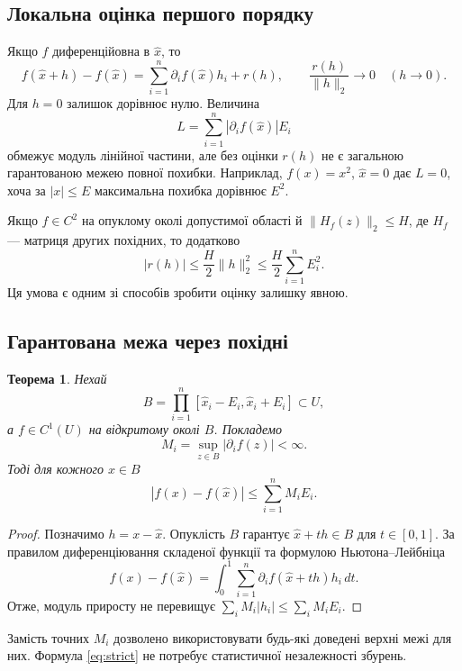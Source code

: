 \documentclass[11pt,a4paper]{article}
\newtheorem{theorem}[definition]{Теорема}
\theoremstyle{remark}
\newcommand{\xh}{\widehat x}
\begin{document}
\subsection*{Локальна оцінка першого порядку}
Якщо $f$ диференційовна в $\xh$, то
\begin{equation}\label{eq:taylor}
 f(\xh+h)-f(\xh)=\sum_{i=1}^n\partial_i f(\xh)h_i+r(h),
 \qquad \frac{r(h)}{\|h\|_2}\longrightarrow0\quad(h\to0).
\end{equation}
Для $h=0$ залишок дорівнює нулю. Величина
\begin{equation}
 L=\sum_{i=1}^n|\partial_i f(\xh)|E_i
\end{equation}
обмежує модуль лінійної частини, але без оцінки $r(h)$ не є загальною гарантованою межею повної похибки. Наприклад, $f(x)=x^2$, $\xh=0$ дає $L=0$, хоча за $|x|\le E$ максимальна похибка дорівнює $E^2$.

Якщо $f\in C^2$ на опуклому околі допустимої області й $\|H_f(z)\|_2\le H$, де $H_f$ --- матриця других похідних, то додатково
\[
 |r(h)|\le\frac H2\|h\|_2^2\le\frac H2\sum_{i=1}^nE_i^2.
\]
Ця умова є одним зі способів зробити оцінку залишку явною.

\subsection*{Гарантована межа через похідні}
\begin{theorem}
Нехай
\[
 B=\prod_{i=1}^n[\xh_i-E_i,\xh_i+E_i]\subset U,
\]
а $f\in C^1(U)$ на відкритому околі $B$. Покладемо
\[
 M_i=\sup_{z\in B}|\partial_i f(z)|<\infty.
\]
Тоді для кожного $x\in B$
\begin{equation}\label{eq:strict}
 |f(x)-f(\xh)|\le\sum_{i=1}^nM_iE_i.
\end{equation}
\end{theorem}
\begin{proof}
Позначимо $h=x-\xh$. Опуклість $B$ гарантує $\xh+th\in B$ для $t\in[0,1]$. За правилом диференціювання складеної функції та формулою Ньютона--Лейбніца
\[
 f(x)-f(\xh)=\int_0^1\sum_{i=1}^n\partial_i f(\xh+th)h_i\,dt.
\]
Отже, модуль приросту не перевищує $\sum_i M_i|h_i|\le\sum_iM_iE_i$.
\end{proof}
Замість точних $M_i$ дозволено використовувати будь-які доведені верхні межі для них. Формула \eqref{eq:strict} не потребує статистичної незалежності збурень.
\end{document}
